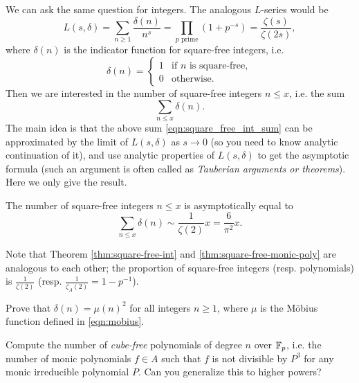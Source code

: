 We can ask the same question for integers.
The analogous $L$-series would be
\begin{equation}
    L(s, \delta) = \sum_{n \ge 1} \frac{\delta(n)}{n^s} = \prod_{p \text{ prime}} (1 + p^{-s}) = \frac{\zeta(s)}{\zeta(2s)},
    \label{eqn:square_free_dirichlet_series_int}
\end{equation}
where $\delta(n)$ is the indicator function for square-free integers, i.e.
\begin{equation}
    \delta(n) = \begin{cases}
        1 & \text{if } n \text{ is square-free},\\
        0 & \text{otherwise.}
    \end{cases}
    \label{eqn:square_free_indicator_int}
\end{equation}
Then we are interested in the number of square-free integers $n \le x$, i.e. the sum
\begin{equation}
\sum_{n \le x} \delta(n).
\label{eqn:square_free_int_sum}
\end{equation}
The main idea is that the above sum \eqref{eqn:square_free_int_sum} can be approximated by the limit of $L(s, \delta)$ as $s \to 0$ (so you need to know analytic continuation of it), and use analytic properties of $L(s, \delta)$ to get the asymptotic formula (such an argument is often called as \emph{Tauberian arguments or theorems}).
Here we only give the result.
\begin{theorem}
    \label{thm:square-free-int}
    The number of square-free integers $n \le x$ is asymptotically equal to
    \begin{equation}
        \sum_{n \le x} \delta(n) \sim \frac{1}{\zeta(2)} x = \frac{6}{\pi^2} x.
        \label{eqn:square_free_int_asymptotic}
    \end{equation}
\end{theorem}
Note that Theorem \ref{thm:square-free-int} and \ref{thm:square-free-monic-poly} are analogous to each other; the proportion of square-free integers (resp. polynomials) is $\frac{1}{\zeta(2)}$ (resp. $\frac{1}{\zeta_A(2)} = 1 - p^{-1}$).

\begin{exercise}
    Prove that $\delta(n) = \mu(n)^2$ for all integers $n \ge 1$, where $\mu$ is the M\"obius function defined in \eqref{eqn:mobius}.
\end{exercise}

\begin{exercise}
    Compute the number of \emph{cube-free} polynomials of degree $n$ over $\mathbb{F}_p$, i.e. the number of monic polynomials $f \in A$ such that $f$ is not divisible by $P^3$ for any monic irreducible polynomial $P$.
    Can you generalize this to higher powers?
\end{exercise}



